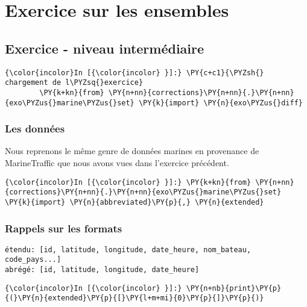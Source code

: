     \hypertarget{exercice-sur-les-ensembles}{%
\section{Exercice sur les ensembles}\label{exercice-sur-les-ensembles}}

    \hypertarget{exercice---niveau-intermuxe9diaire}{%
\subsection{Exercice - niveau
intermédiaire}\label{exercice---niveau-intermuxe9diaire}}

    \begin{Verbatim}[commandchars=\\\{\}]
{\color{incolor}In [{\color{incolor} }]:} \PY{c+c1}{\PYZsh{} chargement de l\PYZsq{}exercice}
        \PY{k+kn}{from} \PY{n+nn}{corrections}\PY{n+nn}{.}\PY{n+nn}{exo\PYZus{}marine\PYZus{}set} \PY{k}{import} \PY{n}{exo\PYZus{}diff}
\end{Verbatim}


    \hypertarget{les-donnuxe9es}{%
\subsubsection{Les données}\label{les-donnuxe9es}}

    Nous reprenons le même genre de données marines en provenance de
MarineTraffic que nous avons vues dans l'exercice précédent.

    \begin{Verbatim}[commandchars=\\\{\}]
{\color{incolor}In [{\color{incolor} }]:} \PY{k+kn}{from} \PY{n+nn}{corrections}\PY{n+nn}{.}\PY{n+nn}{exo\PYZus{}marine\PYZus{}set} \PY{k}{import} \PY{n}{abbreviated}\PY{p}{,} \PY{n}{extended}
\end{Verbatim}


    \hypertarget{rappels-sur-les-formats}{%
\subsubsection{Rappels sur les formats}\label{rappels-sur-les-formats}}

    \begin{verbatim}
étendu: [id, latitude, longitude, date_heure, nom_bateau, code_pays...]
abrégé: [id, latitude, longitude, date_heure]
\end{verbatim}

    \begin{Verbatim}[commandchars=\\\{\}]
{\color{incolor}In [{\color{incolor} }]:} \PY{n+nb}{print}\PY{p}{(}\PY{n}{extended}\PY{p}{[}\PY{l+m+mi}{0}\PY{p}{]}\PY{p}{)}
\end{Verbatim}


